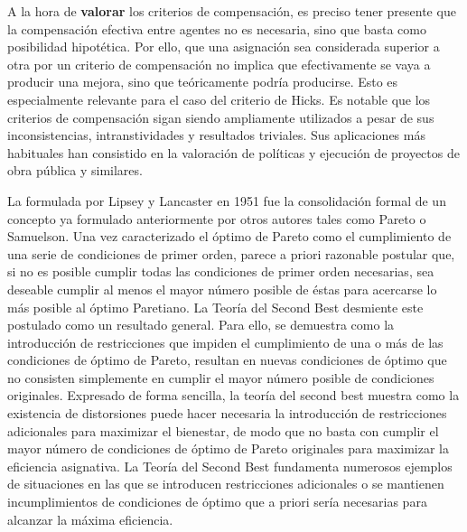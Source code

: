 \documentclass{nuevotema}
\begin{document}
A la hora de \textbf{valorar} los criterios de compensación, es preciso tener presente que la compensación efectiva entre agentes no es necesaria, sino que basta como posibilidad hipotética. Por ello, que una asignación sea considerada superior a otra por un criterio de compensación no implica que efectivamente se vaya a producir una mejora, sino que teóricamente podría producirse. Esto es especialmente relevante para el caso del criterio de Hicks. Es notable que los criterios de compensación sigan siendo ampliamente utilizados a pesar de sus inconsistencias, intranstividades y resultados triviales. Sus aplicaciones más habituales han consistido en la valoración de políticas y ejecución de proyectos de obra pública y similares. 

La  formulada por Lipsey y Lancaster en 1951 fue la consolidación formal de un concepto ya formulado anteriormente por otros autores tales como Pareto o Samuelson. Una vez caracterizado el óptimo de Pareto como el cumplimiento de una serie de condiciones de primer orden, parece a priori razonable postular que, si no es posible cumplir todas las condiciones de primer orden necesarias, sea deseable cumplir al menos el mayor número posible de éstas para acercarse lo más posible al óptimo Paretiano. La Teoría del Second Best desmiente este postulado como un resultado general. Para ello, se demuestra como la introducción de restricciones que impiden el cumplimiento de una o más de las condiciones de óptimo de Pareto, resultan en nuevas condiciones de óptimo que no consisten simplemente en cumplir el mayor número posible de condiciones originales. Expresado de forma sencilla, la teoría del second best muestra como la existencia de distorsiones puede hacer necesaria la introducción de restricciones adicionales para maximizar el bienestar, de modo que no basta con cumplir el mayor número de condiciones de óptimo de Pareto originales para maximizar la eficiencia asignativa. La Teoría del Second Best fundamenta numerosos ejemplos de situaciones en las que se introducen restricciones adicionales o se mantienen incumplimientos de condiciones de óptimo que a priori sería necesarias para alcanzar la máxima eficiencia. 
\end{document}
